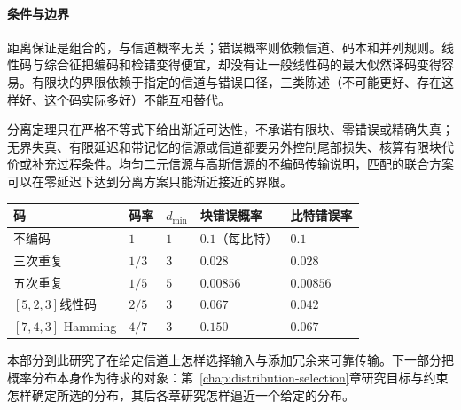 \paragraph{条件与边界}
距离保证是组合的，与信道概率无关；错误概率则依赖信道、码本和并列规则。线性码与综合征把编码和检错变得便宜，却没有让一般线性码的最大似然译码变得容易。有限块的界限依赖于指定的信道与错误口径，三类陈述（不可能更好、存在这样好、这个码实际多好）不能互相替代。

分离定理只在严格不等式下给出渐近可达性，不承诺有限块、零错误或精确失真；无界失真、有限延迟和带记忆的信源或信道都要另外控制尾部损失、核算有限块代价或补充过程条件。均匀二元信源与高斯信源的不编码传输说明，匹配的联合方案可以在零延迟下达到分离方案只能渐近接近的界限。

\begin{BookInlineTable}
 \centering
 \caption{本章的几个码在$p=0.1$的二元对称信道上的表现}
 \label{tab:ccode-summary}
 \begin{tabular}{lllll}
 \toprule
 码 & 码率 & $d_{\min}$ & 块错误概率 & 比特错误率 \\
 \midrule
 不编码 & $1$ & $1$ & $0.1$（每比特） & $0.1$ \\
 三次重复 & $1/3$ & $3$ & $0.028$ & $0.028$ \\
 五次重复 & $1/5$ & $5$ & $0.00856$ & $0.00856$ \\
 $[5,2,3]$线性码 & $2/5$ & $3$ & $0.067$ & $0.042$ \\
 $[7,4,3]$ Hamming & $4/7$ & $3$ & $0.150$ & $0.067$ \\
 \bottomrule
 \end{tabular}
\end{BookInlineTable}

本部分到此研究了在给定信道上怎样选择输入与添加冗余来可靠传输。下一部分把概率分布本身作为待求的对象：第~\ref{chap:distribution-selection}章研究目标与约束怎样确定所选的分布，其后各章研究怎样逼近一个给定的分布。
